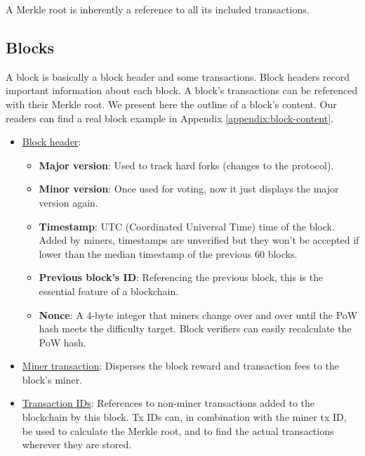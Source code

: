 A Merkle root is inherently a reference to all its included transactions.



\newpage
\subsection{Blocks}
\label{subsec:blocks} %

A block is basically a block header and some transactions. Block headers record important information about each block. A block's transactions can be referenced with their Merkle root. We present here the outline of a block's content. Our readers can find a real block example in Appendix \ref{appendix:block-content}.
\begin{itemize}
    \item \underline{Block header}:
    \begin{itemize}
        \item \textbf{Major version}: Used to track hard forks (changes to the protocol).
        \item \textbf{Minor version}: Once used for voting, now it just displays the major version again.
        \item \textbf{Timestamp}: UTC (Coordinated Universal Time) time of the block. Added by miners, timestamps are unverified but they won't be accepted if lower than the median timestamp of the previous 60 blocks. %
        \item \textbf{Previous block's ID}: Referencing the previous block, this is the essential feature of a blockchain.
        \item \textbf{Nonce}: A 4-byte integer that miners change over and over until the PoW hash meets the difficulty target. Block verifiers can easily recalculate the PoW hash.
    \end{itemize}
    \item \underline{Miner transaction}: Disperses the block reward and transaction fees to the block's miner.
    \item \underline{Transaction IDs}: References to non-miner transactions added to the blockchain by this block. Tx IDs can, in combination with the miner tx ID, be used to calculate the Merkle root, and to find the actual transactions wherever they are stored.\\
\end{itemize}\vspace{.05cm}

